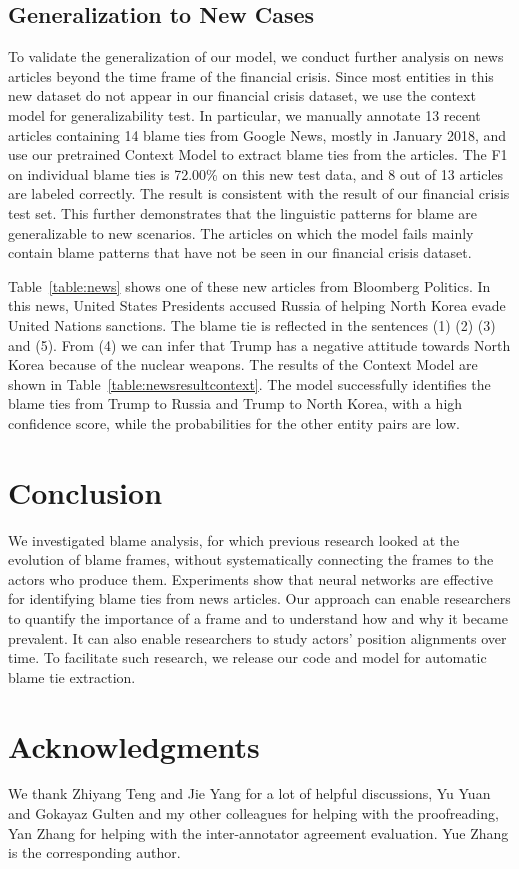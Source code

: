 \documentclass[letterpaper]{article} %
\begin{document}
\subsection{Generalization to New Cases}

To validate the generalization of our model, we conduct further analysis on news articles beyond the time frame of the financial crisis. Since most entities in this new dataset do not appear in our financial crisis dataset, we use the context model for generalizability test. In particular, we manually annotate 13 recent articles containing 14 blame ties from Google News, mostly in January 2018, and use our pretrained Context Model to extract blame ties from the articles. The F1 on individual blame ties is 72.00\% on this new test data, and 8 out of 13 articles are labeled correctly. The result is consistent with the result of our financial crisis test set. This further demonstrates that the linguistic patterns for blame are generalizable to new scenarios. The articles on which the model fails mainly contain blame patterns that have not be seen in our financial crisis dataset.

Table~\ref{table:news} shows one of these new articles from Bloomberg Politics. In this news, United States Presidents accused Russia of helping North Korea evade United Nations sanctions. The blame tie is reflected in the sentences (1) (2) (3) and (5). From (4) we can infer that Trump has a negative attitude towards North Korea because of the nuclear weapons. The results of the Context Model are shown in Table~\ref{table:newsresultcontext}. The model successfully identifies the blame ties from Trump to Russia and Trump to North Korea, with a high confidence score, while the probabilities for the other entity pairs are low.

\section{Conclusion}

We investigated blame analysis, for which previous research looked at the evolution of blame frames, without systematically connecting the frames to the actors who produce them. Experiments show that neural networks are effective for identifying blame ties from news articles.  Our approach can enable researchers to quantify the importance of a frame and to understand how and why it became prevalent. It can also enable researchers to study actors' position alignments over time. To facilitate such research, we release our code and model for automatic blame tie extraction.

\section{Acknowledgments}
We thank Zhiyang Teng and Jie Yang for a lot of helpful discussions, Yu Yuan and Gokayaz Gulten and my other colleagues for helping with the proofreading, Yan Zhang for helping with the inter-annotator agreement evaluation. Yue Zhang is the corresponding author.




\end{document}

